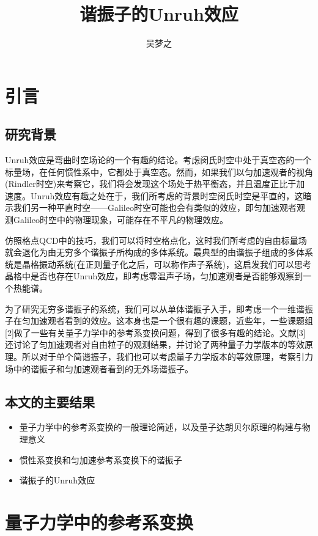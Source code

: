 \documentclass[a4paper]{article}
\title{谐振子的Unruh效应}
\author{吴梦之}
\begin{document}
    \maketitle

    \section{引言}
    \subsection{研究背景}
        Unruh效应是弯曲时空场论的一个有趣的结论。考虑闵氏时空中处于真空态的一个标量场，在任何惯性系中，它都处于真空态。然而，如果我们以匀加速观者的视角(Rindler时空)来考察它，我们将会发现这个场处于热平衡态，并且温度正比于加速度。Unruh效应有趣之处在于，我们所考虑的背景时空闵氏时空是平直的，这暗示我们另一种平直时空——Galileo时空可能也会有类似的效应，即匀加速观者观测Galileo时空中的物理现象，可能存在不平凡的物理效应。

        仿照格点QCD中的技巧，我们可以将时空格点化，这时我们所考虑的自由标量场就会退化为由无穷多个谐振子所构成的多体系统。最典型的由谐振子组成的多体系统是晶格振动系统(在正则量子化之后，可以称作声子系统)，这启发我们可以思考晶格中是否也存在Unruh效应，即考虑零温声子场，匀加速观者是否能够观察到一个热能谱。

        为了研究无穷多谐振子的系统，我们可以从单体谐振子入手，即考虑一个一维谐振子在匀加速观者看到的效应。这本身也是一个很有趣的课题，近些年，一些课题组[2]做了一些有关量子力学中的参考系变换问题，得到了很多有趣的结论。文献[3]还讨论了匀加速观者对自由粒子的观测结果，并讨论了两种量子力学版本的等效原理。所以对于单个简谐振子，我们也可以考虑量子力学版本的等效原理，考察引力场中的谐振子和匀加速观者看到的无外场谐振子。

    \subsection{本文的主要结果}    

        \begin{itemize}
            \item 量子力学中的参考系变换的一般理论简述，以及量子达朗贝尔原理的构建与物理意义
            \item 惯性系变换和匀加速参考系变换下的谐振子
            \item 谐振子的Unruh效应
        \end{itemize}

    \section{量子力学中的参考系变换}
\end{document}
